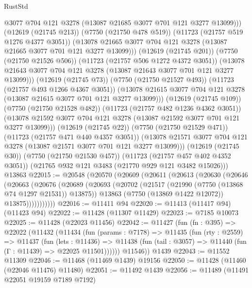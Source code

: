 \begin{lexlean}{RustStd}
\begin{coremodule}
                    @3077
                    @704
                    @121
                    @3278
                    (@13087 @21685 @3077 @701 @121 @3277 @13099)))
                (@12619 (@21745 @213))
                (@7750 (@21750 @478 @519))
                (@11723 (@21757 @519 @1276 @4377 @3051))
                (@13078 @21665 @3077 @704 @121 @3278 (@13087 @21665 @3077 @701 @121 @3277 @13099)))
              (@12619 (@21745 @201))
              (@7750 (@21750 @21526 @506))
              (@11723 (@21757 @506 @1272 @4372 @3051))
              (@13078 @21643 @3077 @704 @121 @3278 (@13087 @21643 @3077 @701 @121 @3277 @13099)))
            (@12619 (@21745 @73))
            (@7750 (@21750 @21527 @493))
            (@11723 (@21757 @493 @1266 @4367 @3051))
            (@13078 @21615 @3077 @704 @121 @3278 (@13087 @21615 @3077 @701 @121 @3277 @13099)))
          (@12619 (@21745 @109))
          (@7750 (@21750 @21528 @482))
          (@11723 (@21757 @482 @1236 @4362 @3051))
          (@13078 @21592 @3077 @704 @121 @3278 (@13087 @21592 @3077 @701 @121 @3277 @13099)))
        (@12619 (@21745 @22))
        (@7750 (@21750 @21529 @471))
        (@11723 (@21757 @471 @440 @4357 @3051))
        (@13078 @21571 @3077 @704 @121 @3278 (@13087 @21571 @3077 @701 @121 @3277 @13099)))
      (@12619 (@21745 @30))
      (@7750 (@21750 @21530 @457))
      (@11723 (@21757 @457 @402 @4352 @3051))
      (@21765 @932 @121 @3483 (@21770 @929 @121 @3482 @15026)))
    @13863
@22015 := @20548
    (@20570
      (@20609
        (@20611
          (@20613
            (@20630
              (@20646
                (@20663
                  (@20676
                    (@20689
                      (@20693
                        (@20702
                          (@21517 (@21990 (@7750 (@13868 @74 @1297 @21531)) @13875))
                          @13863
                          (@7750 (@13869 @1422 @12072))
                          @13875)))))))))))
@22016 := @11411 @94
@22020 := @11413 (@11417 @94) (@11423 @94)
@22022 := @11428 (@11307 @11429)
@22023 := @7185 @10073
@22025 := @11428 (@22023 @11456)
@22042 := @11427
    (fun (fn : @395) =>
    @22022
      (@11432
        (@11434
          (fun (params : @7178) =>
          @11435
            (fun (rty : @2559) =>
            @11437
              (fun (lets : @11436) =>
              @11438 (fun (tail : @3057) => @11440 (fun (Γ : @11439) => @22025 @11501))))))
        @11546))
    @1439
@22043 := @11552 @11309
@22046 := @11468 (@11469 @1439) @19156
@22050 := @11428 (@11460 (@22046 @11476) @11480)
@22051 := @11492 @1439
@22056 := @11489 (@11491 @22051 @19159 @7189 @7192)

\end{coremodule}
\end{lexlean}
